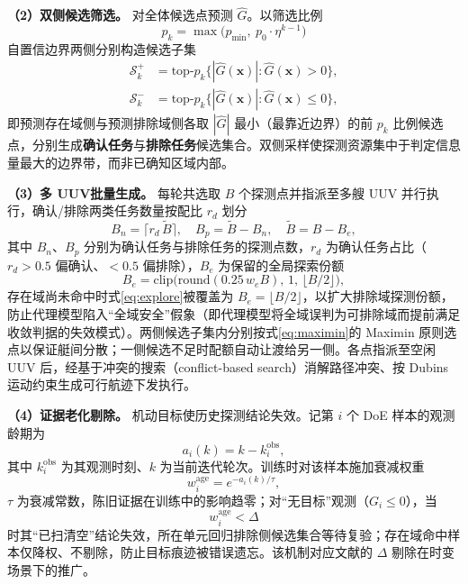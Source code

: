 \documentclass[a4paper,UTF8,zihao=5,twocolumn]{ctexart}
\numberwithin{equation}{section}
\begin{document}
\textbf{（2）双侧候选筛选。} 对全体候选点预测 $\hat G$。以筛选比例
\begin{equation}
  p_k=\max\bigl(p_{\min},\ p_0\cdot\eta^{k-1}\bigr)
  \label{eq:pk}
\end{equation}
自置信边界两侧分别构造候选子集
\begin{equation}
\begin{aligned}
  \mathcal{S}_k^{+}&=\mathrm{top\text{-}}p_k\bigl\{|\hat G(\symbf{x})|:\hat G(\symbf{x})>0\bigr\},\\
  \mathcal{S}_k^{-}&=\mathrm{top\text{-}}p_k\bigl\{|\hat G(\symbf{x})|:\hat G(\symbf{x})\le0\bigr\},
\end{aligned}
  \label{eq:twoside}
\end{equation}
即预测存在域侧与预测排除域侧各取 $|\hat G|$ 最小（最靠近边界）的前 $p_k$ 比例候选点，分别生成\textbf{确认任务}与\textbf{排除任务}候选集合。双侧采样使探测资源集中于判定信息量最大的边界带，而非已确知区域内部。

\textbf{（3）多 UUV批量生成。} 每轮共选取 $B$ 个探测点并指派至多艘 UUV 并行执行，确认/排除两类任务数量按配比 $r_d$ 划分
\begin{equation}
  B_{n}=\lceil r_d\,\tilde B\rceil,\quad B_{p}=\tilde B-B_{n},\quad \tilde B=B-B_{e},
  \label{eq:quota}
\end{equation}
其中 $B_n$、$B_p$ 分别为确认任务与排除任务的探测点数，$r_d$ 为确认任务占比（$r_d>0.5$ 偏确认、$<0.5$ 偏排除），$B_e$ 为保留的全局探索份额
\begin{equation}
  B_{e}=\mathrm{clip}\bigl(\mathrm{round}(0.25\,w_e B),\,1,\,\lfloor B/2\rfloor\bigr),
  \label{eq:explore}
\end{equation}
存在域尚未命中时式\eqref{eq:explore}被覆盖为 $B_e=\lfloor B/2\rfloor$，以扩大排除域探测份额，防止代理模型陷入“全域安全”假象（即代理模型将全域误判为可排除域而提前满足收敛判据的失效模式）。两侧候选子集内分别按式\eqref{eq:maximin}的 Maximin 原则选点以保证艇间分散；一侧候选不足时配额自动让渡给另一侧。各点指派至空闲 UUV 后，经基于冲突的搜索（conflict-based search）\cite{ref21}消解路径冲突、按 Dubins 运动约束\cite{ref22}生成可行航迹下发执行。

\textbf{（4）证据老化剔除。} 机动目标使历史探测结论失效。记第 $i$ 个 DoE 样本的观测龄期为
\begin{equation}
  a_i(k)=k-k_i^{\mathrm{obs}},
  \label{eq:age}
\end{equation}
其中 $k_i^{\mathrm{obs}}$ 为其观测时刻、$k$ 为当前迭代轮次。训练时对该样本施加衰减权重
\begin{equation}
  w_i^{\mathrm{age}}=e^{-a_i(k)/\tau},
  \label{eq:agew}
\end{equation}
$\tau$ 为衰减常数，陈旧证据在训练中的影响趋零；对“无目标”观测（$G_i\le0$），当
\begin{equation}
  w_i^{\mathrm{age}}<\Delta
  \label{eq:reverify}
\end{equation}
时其“已扫清空”结论失效，所在单元回归排除侧候选集合等待复验；存在域命中样本仅降权、不剔除，防止目标痕迹被错误遗忘。该机制对应文献\cite{ref9}的 $\Delta$ 剔除在时变场景下的推广。
\end{document}
